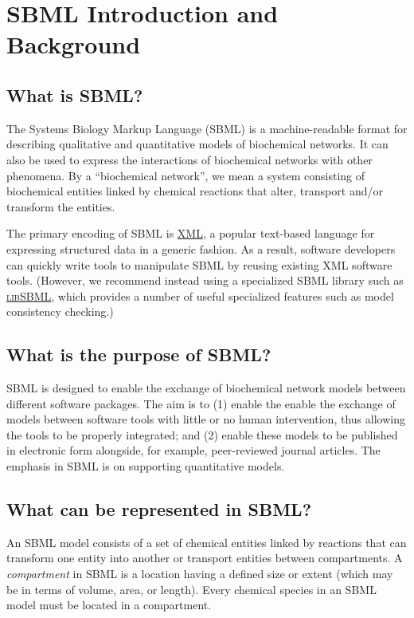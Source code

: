\documentclass{sbmlfaq}
\begin{document}
\section{SBML Introduction and Background}
\label{sec:intro}

\subsection{What is SBML?}

The Systems Biology Markup Language (SBML) is a machine-readable format for
describing qualitative and quantitative models of biochemical networks.  It
can also be used to express the interactions of biochemical networks with
other phenomena.  By a ``biochemical network'', we mean a system consisting
of biochemical entities linked by chemical reactions that alter, transport
and/or transform the entities.

The primary encoding of SBML is \href{http://www.w3.org/XML/}{XML}, a
popular text-based language for expressing structured data in a generic
fashion.  As a result, software developers can quickly write tools to
manipulate SBML by reusing existing XML software tools.  (However, we
recommend instead using a specialized SBML library such as
\href{http://sbml.org/software/libsbml}{\textsc{libSBML}}, which provides a
number of useful specialized features such as model consistency checking.)


\subsection{What is the purpose of SBML?}

SBML is designed to enable the exchange of biochemical network models
between different software packages.  The aim is to (1) enable the enable
the exchange of models between software tools with little or no human
intervention, thus allowing the tools to be properly integrated; and (2)
enable these models to be published in electronic form alongside, for
example, peer-reviewed journal articles.  The emphasis in SBML is on
supporting quantitative models.


\subsection{What can be represented in SBML?}

An SBML model consists of a set of chemical entities linked by reactions
that can transform one entity into another or transport entities between
compartments.  A \emph{compartment} in SBML is a location having a defined
size or extent (which may be in terms of volume, area, or length).  Every
chemical species in an SBML model must be located in a compartment.
\end{document}
